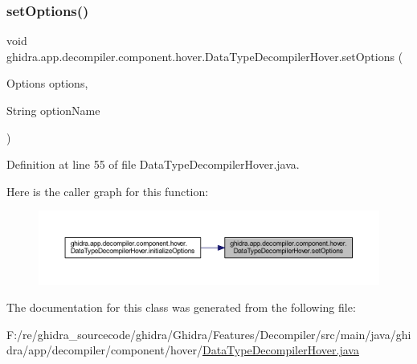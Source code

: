 \subsubsection{\texorpdfstring{setOptions()}{setOptions()}}
{\footnotesize\ttfamily void ghidra.\+app.\+decompiler.\+component.\+hover.\+Data\+Type\+Decompiler\+Hover.\+set\+Options (\begin{DoxyParamCaption}\item[{Options}]{options,  }\item[{String}]{option\+Name }\end{DoxyParamCaption})\hspace{0.3cm}{\ttfamily [inline]}}



Definition at line 55 of file Data\+Type\+Decompiler\+Hover.\+java.

Here is the caller graph for this function\+:
\nopagebreak
\begin{figure}[H]
\begin{center}
\leavevmode
\includegraphics[width=350pt]{classghidra_1_1app_1_1decompiler_1_1component_1_1hover_1_1_data_type_decompiler_hover_aa8cbe977599823b60fde35a7a62c7151_icgraph}
\end{center}
\end{figure}


The documentation for this class was generated from the following file\+:\begin{DoxyCompactItemize}
\item 
F\+:/re/ghidra\+\_\+sourcecode/ghidra/\+Ghidra/\+Features/\+Decompiler/src/main/java/ghidra/app/decompiler/component/hover/\mbox{\hyperlink{_data_type_decompiler_hover_8java}{Data\+Type\+Decompiler\+Hover.\+java}}\end{DoxyCompactItemize}
